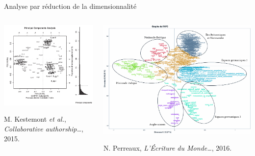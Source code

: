 \documentclass[ignorenonframetext]{beamer}
\begin{document}
\begin{frame}{Analyse par réduction de la dimensionnalité}

\begin{columns}
	\begin{column}{0.5\textwidth}
		\includegraphics[width=\textwidth]{img/Kestemont_Hildegarde.png}
	
		{\small M. Kestemont \textit{et al.}, \textit{Collaborative authorship…}, 2015.}
	\end{column}
	\begin{column}{0.5\textwidth}
		\includegraphics[width=\textwidth]{img/Perreaux_Chartes.jpg}
		
		{\small N. Perreaux, \textit{L'Écriture du  Monde…}, 2016.}
	\end{column}
\end{columns}

\end{frame}
\end{document}
